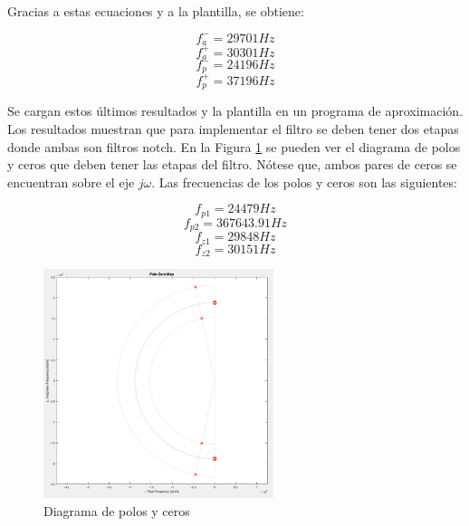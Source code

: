 Gracias a estas ecuaciones y a la plantilla, se obtiene:

\begin{displaymath}  f^-_a = 29701 Hz \end{displaymath}     
\begin{displaymath}  f^+_a= 30301 Hz \end{displaymath} 
\begin{displaymath}  f^-_p= 24196 Hz \end{displaymath} 
\begin{displaymath}  f^+_p= 37196 Hz \end{displaymath} 


Se cargan estos últimos resultados y la plantilla en un programa de aproximación. Los resultados muestran que para implementar el filtro se deben tener dos etapas donde ambas son filtros notch. En la Figura \ref{ej4_diagrama_polos_ceros} se pueden ver el diagrama de polos y ceros que deben tener las etapas del filtro. Nótese que, ambos pares de ceros se encuentran sobre el eje $j\omega$. Las frecuencias de los polos y ceros son las siguientes:

\begin{displaymath}  f_{p1} = 24479 Hz \end{displaymath}     
\begin{displaymath}  f_{p2}= 367643.91 Hz \end{displaymath} 
\begin{displaymath}  f_{z1}= 29848 Hz \end{displaymath} 
\begin{displaymath}  f_{z2}= 30151 Hz \end{displaymath} 


\begin{figure}[h!]                                                       
    \centering\includegraphics[width=0.6\textwidth]{../Ex4/Resources/ej4_diagrama_polos_ceros.png}
    \caption{Diagrama de polos y ceros}
    \label{ej4_diagrama_polos_ceros}
    \end{figure}

